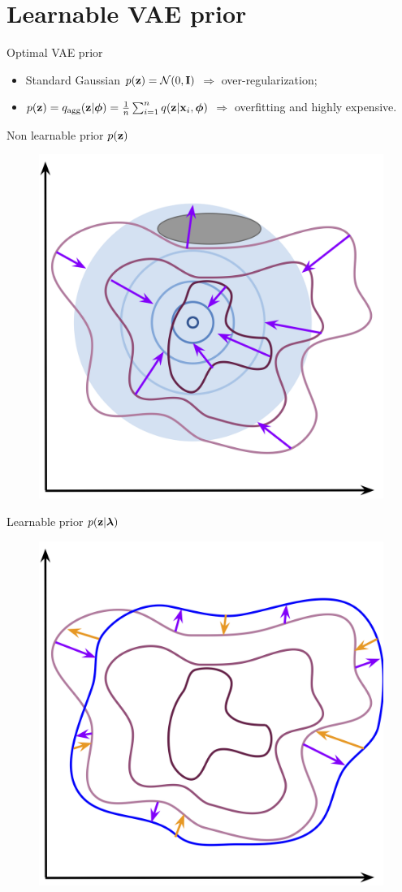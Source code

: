 \section{Learnable VAE prior}
\begin{frame}{Optimal VAE prior}
	\begin{itemize}
		\item Standard Gaussian $p(\mathbf{z}) = \mathcal{N}(0, \mathbf{I})$ $\Rightarrow$ over-regularization;
		\item $p(\mathbf{z}) = q_{\text{agg}}(\mathbf{z} | \boldsymbol{\phi}) = \frac{1}{n}\sum_{i=1}^n q(\mathbf{z} | \mathbf{x}_i, \boldsymbol{\phi})$ $\Rightarrow$ overfitting and highly expensive.
	\end{itemize}
	\vspace{-0.5cm}
	\begin{minipage}[t]{0.5\columnwidth}
		\begin{block}{Non learnable prior $p(\mathbf{z})$}
			\begin{figure}[h]
				\centering
				\includegraphics[width=0.6\linewidth]{figs/non_learnable_prior}
			\end{figure}
		\end{block}
	\end{minipage}%
	\begin{minipage}[t]{0.5\columnwidth}
		\begin{block}{Learnable prior $p(\mathbf{z} | \boldsymbol{\lambda})$}
			\begin{figure}[h]
				\centering
				\includegraphics[width=0.6\linewidth]{figs/learnable_prior}

\end{figure}
\end{block}
\end{minipage}
\end{frame}

